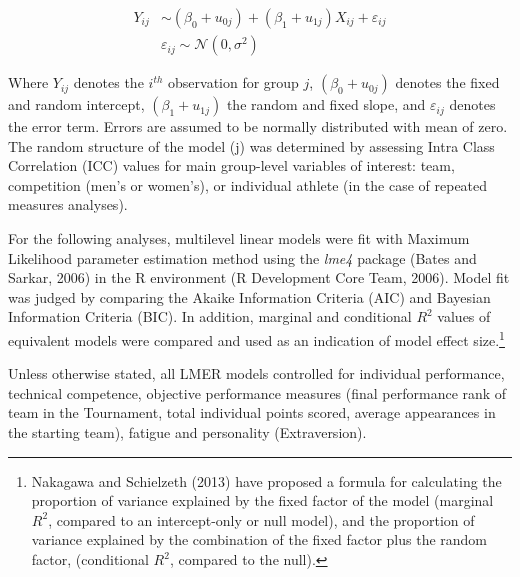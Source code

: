 \begin{CJK}{UTF8}{gbsn}
    \begin{align*}
      Y_{ij} & \sim  (\beta_{0} + u_{0j}) + (\beta_{1} + u_{1j})X_{ij} + \varepsilon_{ij}\\
           & \varepsilon_{ij} \sim \mathcal{N}(0,\sigma^{2})
    \end{align*}

Where $Y_{ij}$ denotes the $i^{th}$ observation for group $j$, $(\beta_{0} + u_{0j})$ denotes the fixed and random intercept, $(\beta_{1} + u_{1j})$ the random and fixed slope, and $\varepsilon_{ij}$ denotes the error term.  Errors are assumed to be normally distributed with mean of zero.
The random structure of the model (j) was determined by assessing Intra Class Correlation (ICC) values for main group-level variables of interest: team, competition (men's or women's), or individual athlete (in the case of repeated measures analyses).

For the following analyses, multilevel linear models were fit with Maximum Likelihood parameter estimation method using the \textit{lme4} package (Bates and Sarkar, 2006) in the R environment (R Development Core Team, 2006). Model fit was judged by comparing the Akaike Information Criteria (AIC) and Bayesian Information Criteria (BIC).  In addition, marginal and conditional $R^2$ values of equivalent models were compared and used as an indication of model effect size.\footnote{Nakagawa and Schielzeth (2013) have proposed a formula for calculating the proportion of variance explained by the fixed factor of the model (marginal $R^2$, compared to an intercept-only or null model), and the proportion of variance explained by the combination of the fixed factor plus the random factor, (conditional $R^2$, compared to the null).}


Unless otherwise stated, all LMER models controlled for individual performance, technical competence, objective performance measures (final performance rank of team in the Tournament, total individual points scored, average appearances in the starting team), fatigue and personality (Extraversion).



\end{CJK}
